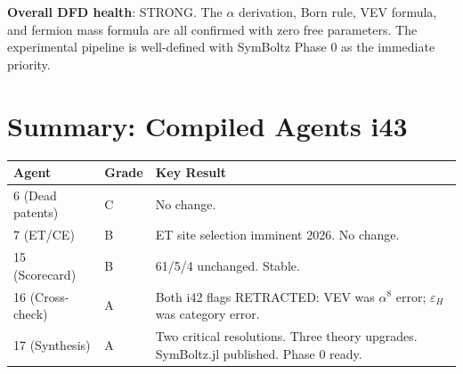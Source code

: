 \documentclass[11pt,a4paper]{article}
\begin{document}
\textbf{Overall DFD health}: STRONG. The $\alpha$ derivation, Born rule, VEV formula, and fermion mass formula are all confirmed with zero free parameters. The experimental pipeline is well-defined with SymBoltz Phase 0 as the immediate priority.


\section*{Summary: Compiled Agents i43}

\begin{center}
\begin{tabular}{llp{8cm}}
\toprule
\textbf{Agent} & \textbf{Grade} & \textbf{Key Result} \\
\midrule
6 (Dead patents) & C & No change. \\
7 (ET/CE) & B & ET site selection imminent 2026. No change. \\
15 (Scorecard) & B & 61/5/4 unchanged. Stable. \\
16 (Cross-check) & A & Both i42 flags RETRACTED: VEV was $\alpha^8$ error; $\varepsilon_H$ was category error. \\
17 (Synthesis) & A & Two critical resolutions. Three theory upgrades. SymBoltz.jl published. Phase 0 ready. \\
\bottomrule
\end{tabular}
\end{center}
\end{document}

